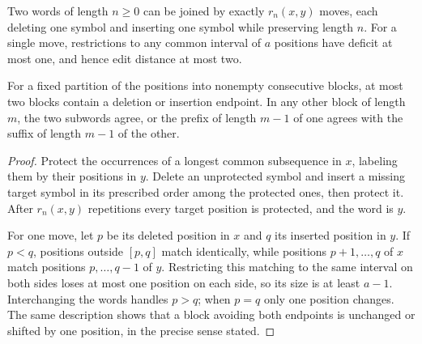 \begin{lemma}\label{upper:move}
Two words of length $n\ge0$ can be joined by exactly $r_n(x,y)$ moves, each
deleting one symbol and inserting one symbol while preserving length $n$.
For a single move, restrictions to any common interval of $a$ positions
have deficit at most one, and hence edit distance at most two.

For a fixed partition of the positions into nonempty consecutive blocks, at most
two blocks contain a deletion or insertion endpoint.  In any other block
of length $m$, the two subwords agree, or the prefix of length $m-1$ of
one agrees with the suffix of length $m-1$ of the other.
\end{lemma}
\begin{proof}
Protect the occurrences of a longest common subsequence in $x$, labeling
them by their positions in $y$.  Delete an unprotected symbol and insert
a missing target symbol in its prescribed order among the protected
ones, then protect it.  After $r_n(x,y)$ repetitions every target position
is protected, and the word is $y$.

For one move, let $p$ be its deleted position in $x$ and $q$ its inserted
position in $y$.  If $p<q$, positions outside $[p,q]$ match identically,
while positions $p+1,\ldots,q$ of $x$ match positions $p,\ldots,q-1$ of
$y$.  Restricting this matching to the same interval on both sides loses
at most one position on each side, so its size is at least $a-1$.
Interchanging the words handles $p>q$; when $p=q$ only one position
changes.  The same description shows that a block avoiding both endpoints
is unchanged or shifted by one position, in the precise sense stated.
\end{proof}

